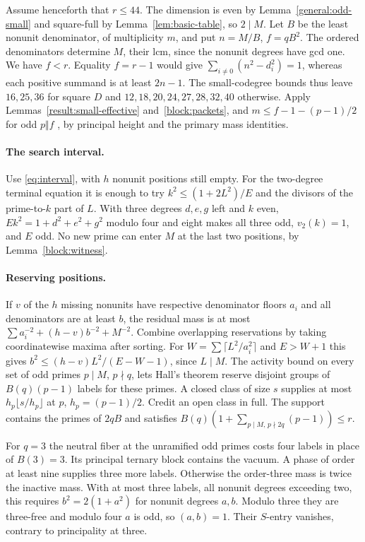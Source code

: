 \documentclass[11pt]{amsart}
\numberwithin{equation}{section}
\theoremstyle{definition}
\theoremstyle{plain}
\begin{document}
Assume henceforth that $r\le44$. The dimension is even by Lemma~\ref{general:odd-small} and square-full by Lemma~\ref{lem:basic-table}, so $2\mid M$.
Let $B$ be the least nonunit denominator, of multiplicity $m$, and put
$n=M/B$, $f=qB^2$. The ordered denominators determine $M$, their lcm,
since the nonunit degrees have gcd one. We have $f<r$. Equality
$f=r-1$ would give $\sum_{i\ne0}(n^2-d_i^2)=1$, whereas each
positive summand is at least $2n-1$. The small-codegree bounds thus leave
$16,25,36$ for square $D$ and $12,18,20,24,27,28,32,40$ otherwise.
Apply Lemmas~\ref{result:small-effective} and~\ref{block:packets}, and
$m\le f-1-(p-1)/2$ for odd $p\Vert f$
\cite[Proposition~19.9]{BDPcore}, by principal height and the primary mass identities.

\paragraph{The search interval.}
Use \eqref{eq:interval}, with $h$ nonunit positions still empty.
For the two-degree terminal equation it is enough to try
$k^2\le(1+2L^2)/E$ and the divisors of the prime-to-$k$ part of $L$.
With three degrees $d,e,g$ left and $k$ even,
$Ek^2=1+d^2+e^2+g^2$ modulo four and eight makes all three odd,
$v_2(k)=1$, and $E$ odd. No new prime can enter $M$ at the last
two positions, by Lemma~\ref{block:witness}. 

\paragraph{Reserving positions.}
If $v$ of the $h$ missing nonunits have respective denominator floors
$a_i$ and all denominators are at least $b$, the residual mass is at most
$\sum a_i^{-2}+(h-v)b^{-2}+M^{-2}$. Combine overlapping reservations
by taking coordinatewise maxima after sorting. For
$W=\sum\lceil L^2/a_i^2\rceil$ and $E>W+1$ this gives
$b^2\le(h-v)L^2/(E-W-1)$, since $L\mid M$. The activity bound on
every set of odd primes $p\mid M$, $p\nmid q$, lets Hall's theorem reserve
disjoint groups of $B(q)(p-1)$ labels for these primes. A closed class of
size $s$ supplies at most $h_p\lfloor s/h_p\rfloor$ at $p$,
$h_p=(p-1)/2$. Credit an open class in full. The support contains the
primes of $2qB$ and satisfies $B(q)(1+\sum_{p\mid M,\,p\nmid2q}(p-1))\le r$.

For $q=3$ the neutral fiber at the unramified odd primes costs four
labels in place of $B(3)=3$. Its principal ternary block contains the
vacuum. A phase of order at least nine supplies three more labels.
Otherwise the order-three mass is twice the inactive mass. With at most
three labels, all nonunit degrees exceeding two, this requires
$b^2=2(1+a^2)$ for nonunit degrees $a,b$. Modulo three they are
three-free and modulo four $a$ is odd, so $(a,b)=1$. Their $S$-entry
vanishes, contrary to principality at three.
\end{document}
